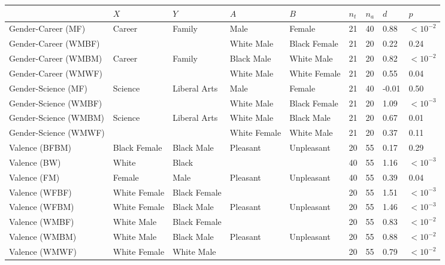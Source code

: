 \begin{tabular}{lllllllll}
\toprule
{} &           $X$ &           $Y$ &           $A$ &           $B$ & $n_t$ & $n_a$ &                       $d$ &         $p$ \\
\midrule
Gender-Career (MF)    &        Career &        Family &          Male &        Female &    21 &    40 &   \cellcolor{d_large}0.88 &  $<10^{-2}$ \\
Gender-Career (WMBF)  &               &               &    White Male &  Black Female &    21 &    20 &   \cellcolor{d_small}0.22 &        0.24 \\
Gender-Career (WMBM)  &        Career &        Family &    Black Male &    White Male &    21 &    20 &   \cellcolor{d_large}0.82 &  $<10^{-2}$ \\
Gender-Career (WMWF)  &               &               &    White Male &  White Female &    21 &    20 &  \cellcolor{d_medium}0.55 &        0.04 \\
Gender-Science (MF)   &       Science &  Liberal Arts &          Male &        Female &    21 &    40 &                     -0.01 &        0.50 \\
Gender-Science (WMBF) &               &               &    White Male &  Black Female &    21 &    20 &   \cellcolor{d_large}1.09 &  $<10^{-3}$ \\
Gender-Science (WMBM) &       Science &  Liberal Arts &    White Male &    Black Male &    21 &    20 &  \cellcolor{d_medium}0.67 &        0.01 \\
Gender-Science (WMWF) &               &               &  White Female &    White Male &    21 &    20 &   \cellcolor{d_small}0.37 &        0.11 \\
Valence (BFBM)        &  Black Female &    Black Male &      Pleasant &    Unpleasant &    20 &    55 &                      0.17 &        0.29 \\
Valence (BW)          &         White &         Black &               &               &    40 &    55 &   \cellcolor{d_large}1.16 &  $<10^{-3}$ \\
Valence (FM)          &        Female &          Male &      Pleasant &    Unpleasant &    40 &    55 &   \cellcolor{d_small}0.39 &        0.04 \\
Valence (WFBF)        &  White Female &  Black Female &               &               &    20 &    55 &   \cellcolor{d_large}1.51 &  $<10^{-3}$ \\
Valence (WFBM)        &  White Female &    Black Male &      Pleasant &    Unpleasant &    20 &    55 &   \cellcolor{d_large}1.46 &  $<10^{-3}$ \\
Valence (WMBF)        &    White Male &  Black Female &               &               &    20 &    55 &   \cellcolor{d_large}0.83 &  $<10^{-2}$ \\
Valence (WMBM)        &    White Male &    Black Male &      Pleasant &    Unpleasant &    20 &    55 &   \cellcolor{d_large}0.88 &  $<10^{-2}$ \\
Valence (WMWF)        &  White Female &    White Male &               &               &    20 &    55 &  \cellcolor{d_medium}0.79 &  $<10^{-2}$ \\
\bottomrule
\end{tabular}
